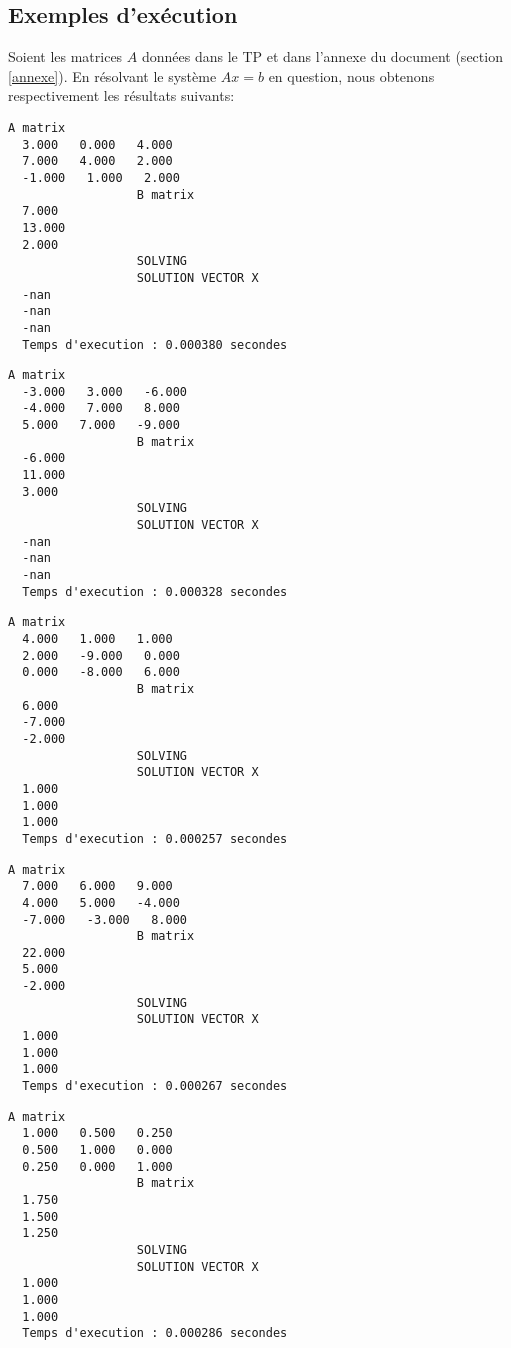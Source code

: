 \subsection{Exemples d'exécution}
Soient les matrices $A$ données dans le TP et dans l'annexe du document (section \ref{annexe}).
En résolvant le système $Ax=b$ en question, nous obtenons respectivement les résultats suivants:
\\

\begin{lstlisting}[caption={$A_1X=B$} results, basicstyle=\fontsize{8}{10}\selectfont]
                  A matrix
  3.000   0.000   4.000   
  7.000   4.000   2.000   
  -1.000   1.000   2.000   
                  B matrix
  7.000   
  13.000   
  2.000   
                  SOLVING
                  SOLUTION VECTOR X 
  -nan   
  -nan   
  -nan   
  Temps d'execution : 0.000380 secondes
\end{lstlisting}

\begin{lstlisting}[caption={$A_2X=B$} results, basicstyle=\fontsize{8}{10}\selectfont]
                  A matrix
  -3.000   3.000   -6.000   
  -4.000   7.000   8.000   
  5.000   7.000   -9.000   
                  B matrix
  -6.000   
  11.000   
  3.000   
                  SOLVING
                  SOLUTION VECTOR X 
  -nan   
  -nan   
  -nan   
  Temps d'execution : 0.000328 secondes
\end{lstlisting}

\begin{lstlisting}[caption={$A_3X=B$} results, basicstyle=\fontsize{8}{10}\selectfont]
                  A matrix
  4.000   1.000   1.000   
  2.000   -9.000   0.000   
  0.000   -8.000   6.000   
                  B matrix
  6.000   
  -7.000   
  -2.000   
                  SOLVING
                  SOLUTION VECTOR X 
  1.000   
  1.000   
  1.000   
  Temps d'execution : 0.000257 secondes
\end{lstlisting}

\begin{lstlisting}[caption={$A_4X=B$} results, basicstyle=\fontsize{8}{10}\selectfont]
                  A matrix
  7.000   6.000   9.000   
  4.000   5.000   -4.000   
  -7.000   -3.000   8.000   
                  B matrix
  22.000   
  5.000   
  -2.000   
                  SOLVING
                  SOLUTION VECTOR X 
  1.000   
  1.000   
  1.000   
  Temps d'execution : 0.000267 secondes
\end{lstlisting}

\begin{lstlisting}[caption={$A_5X=B$} results, basicstyle=\fontsize{8}{10}\selectfont]
                  A matrix
  1.000   0.500   0.250   
  0.500   1.000   0.000   
  0.250   0.000   1.000   
                  B matrix
  1.750   
  1.500   
  1.250   
                  SOLVING
                  SOLUTION VECTOR X 
  1.000   
  1.000   
  1.000   
  Temps d'execution : 0.000286 secondes
\end{lstlisting}


